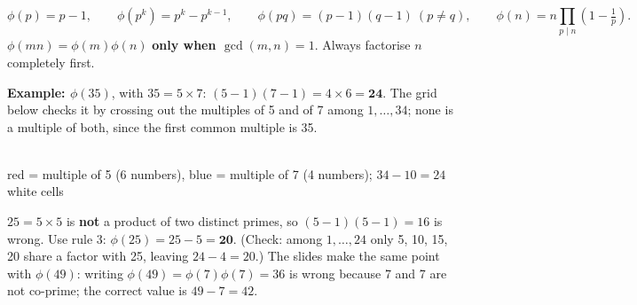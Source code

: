 \begin{mustknow}
\[
\phi(p) = p - 1, \qquad \phi(p^k) = p^k - p^{k-1}, \qquad \phi(pq) = (p-1)(q-1)\ (p \ne q), \qquad
\phi(n) = n\prod_{p \mid n}\left(1 - \tfrac1p\right).
\]
$\phi(mn) = \phi(m)\phi(n)$ \textbf{only when $\gcd(m, n) = 1$}. Always factorise $n$ completely first.
\end{mustknow}

\textbf{Example: $\phi(35)$}, with $35 = 5 \times 7$: $(5-1)(7-1) = 4 \times 6 = \mathbf{24}$. The grid below checks it by crossing out the multiples of 5 and of 7 among $1, \dots, 34$; none is a multiple of both, since the first common multiple is 35.
\begin{center}
\\[2pt]
{\footnotesize red = multiple of 5 (6 numbers), blue = multiple of 7 (4 numbers); $34 - 10 = 24$ white cells}
\end{center}

\begin{trap}
$25 = 5 \times 5$ is \textbf{not} a product of two distinct primes, so $(5-1)(5-1) = 16$ is wrong. Use rule 3: $\phi(25) = 25 - 5 = \mathbf{20}$. (Check: among $1, \dots, 24$ only 5, 10, 15, 20 share a factor with 25, leaving $24 - 4 = 20$.) The slides make the same point with $\phi(49)$: writing $\phi(49) = \phi(7)\phi(7) = 36$ is wrong because 7 and 7 are not co-prime; the correct value is $49 - 7 = 42$.
\end{trap}

